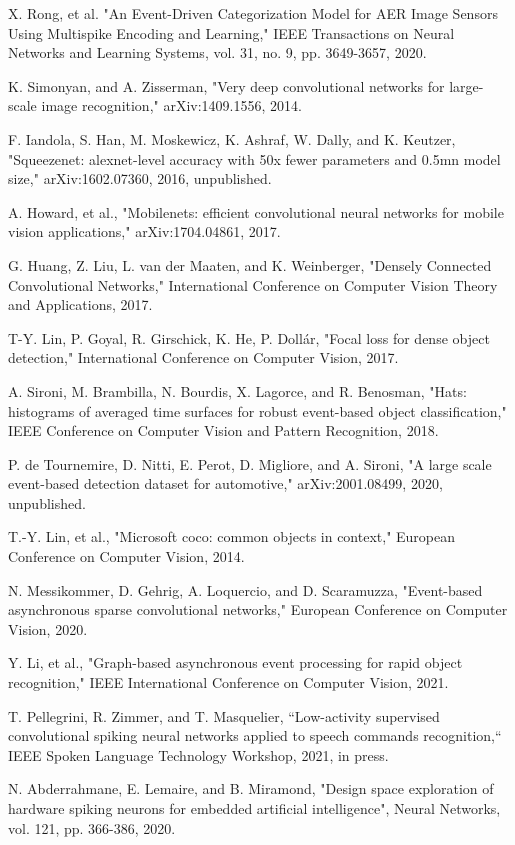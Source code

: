 \documentclass[conference]{IEEEtran}
\begin{document}
\begin{thebibliography}{00}
 X. Rong, et al. "An Event-Driven Categorization Model for AER Image Sensors Using Multispike Encoding and Learning," IEEE Transactions on Neural Networks and Learning Systems, vol. 31, no. 9, pp. 3649-3657, 2020.

 K. Simonyan, and A. Zisserman, "Very deep convolutional networks for large-scale image recognition," arXiv:1409.1556, 2014.

 F. Iandola, S. Han, M. Moskewicz, K. Ashraf, W. Dally, and K. Keutzer, "Squeezenet: alexnet-level accuracy with 50x fewer parameters and 0.5mn model size,"	arXiv:1602.07360, 2016, unpublished.

 A. Howard, et al., "Mobilenets: efficient convolutional neural networks for mobile vision applications," arXiv:1704.04861, 2017.

 G. Huang, Z. Liu, L. van der Maaten, and K. Weinberger, "Densely Connected Convolutional Networks," International Conference on Computer Vision Theory and Applications, 2017.

 T-Y. Lin, P. Goyal, R. Girschick, K. He, P. Dollár, "Focal loss for dense object detection," International Conference on Computer Vision, 2017.

 A. Sironi, M. Brambilla, N. Bourdis, X. Lagorce, and R. Benosman, "Hats: histograms of averaged time surfaces for robust event-based object classification," IEEE Conference on Computer Vision and Pattern Recognition, 2018.

 P. de Tournemire, D. Nitti, E. Perot, D. Migliore, and A. Sironi, "A large scale event-based detection dataset for automotive," arXiv:2001.08499, 2020, unpublished.

 T.-Y. Lin, et al., "Microsoft coco: common objects in context," European Conference on
Computer Vision, 2014.

 N. Messikommer, D. Gehrig, A. Loquercio, and D. Scaramuzza, "Event-based asynchronous sparse convolutional networks," European Conference on Computer Vision, 2020.

 Y. Li, et al., "Graph-based asynchronous event processing for rapid object recognition," IEEE International Conference on Computer Vision, 2021.

 T. Pellegrini, R. Zimmer, and T. Masquelier, ``Low-activity supervised convolutional spiking neural networks applied to speech commands recognition,`` IEEE Spoken Language Technology Workshop, 2021, in press.

 N. Abderrahmane, E. Lemaire, and B. Miramond, "Design space exploration of hardware spiking neurons for embedded artificial intelligence", Neural Networks, vol. 121, pp. 366-386, 2020.

\end{thebibliography}
\end{document}
